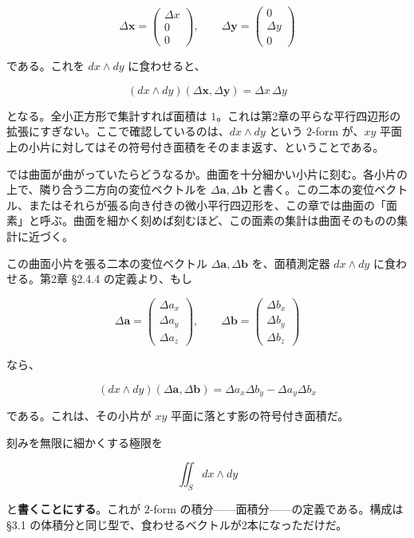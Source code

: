 \documentclass[a4paper,12pt,openany]{book}
\begin{document}
\[\Delta\mathbf{x}=\begin{pmatrix}\Delta x\\0\\0\end{pmatrix},\qquad
\Delta\mathbf{y}=\begin{pmatrix}0\\\Delta y\\0\end{pmatrix}\]

である。これを \(dx \wedge dy\) に食わせると、

\[(dx \wedge dy)(\Delta\mathbf{x},\Delta\mathbf{y})=\Delta x\,\Delta y\]

となる。全小正方形で集計すれば面積は
\(1\)。これは第2章の平らな平行四辺形の拡張にすぎない。ここで確認しているのは、\(dx\wedge dy\)
という \(2\)-form が、\(xy\)
平面上の小片に対してはその符号付き面積をそのまま返す、ということである。

では曲面が曲がっていたらどうなるか。曲面を十分細かい小片に刻む。各小片の上で、隣り合う二方向の変位ベクトルを
\(\Delta\mathbf{a},\Delta\mathbf{b}\)
と書く。この二本の変位ベクトル、またはそれらが張る向き付きの微小平行四辺形を、この章では曲面の「面素」と呼ぶ。曲面を細かく刻めば刻むほど、この面素の集計は曲面そのものの集計に近づく。

この曲面小片を張る二本の変位ベクトル
\(\Delta\mathbf{a},\Delta\mathbf{b}\) を、面積測定器 \(dx \wedge dy\)
に食わせる。第2章 §2.4.4 の定義より、もし

\[\Delta\mathbf{a}=\begin{pmatrix}\Delta a_x\\\Delta a_y\\\Delta a_z\end{pmatrix},\qquad
\Delta\mathbf{b}=\begin{pmatrix}\Delta b_x\\\Delta b_y\\\Delta b_z\end{pmatrix}\]

なら、

\[(dx \wedge dy)(\Delta\mathbf{a},\Delta\mathbf{b})
=\Delta a_x\Delta b_y-\Delta a_y\Delta b_x\]

である。これは、その小片が \(xy\) 平面に落とす影の符号付き面積だ。

刻みを無限に細かくする極限を

\[\iint_S dx \wedge dy\]

と\textbf{書くことにする}。これが \(2\)-form
の積分——面積分——の定義である。構成は §3.1
の体積分と同じ型で、食わせるベクトルが2本になっただけだ。
\end{document}
